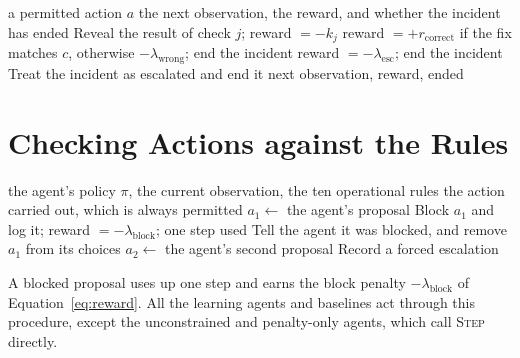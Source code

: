 \begin{algorithm}[H]
\caption{Taking one step in an incident}
\label{alg:step}
\begin{algorithmic}[1]
\Require a permitted action $a$
\Ensure the next observation, the reward, and whether the incident has ended
    \State Reveal the result of check $j$; \quad reward $= -k_j$
    \State reward $= +r_{\text{correct}}$ if the fix matches $c$, otherwise $-\lambda_{\text{wrong}}$; \quad end the incident
    \State reward $= -\lambda_{\text{esc}}$; \quad end the incident
  \EndIf
    \State Treat the incident as escalated and end it
  \EndIf
  \State \Return next observation, reward, ended
\EndProcedure
\end{algorithmic}
\end{algorithm}

\section{Checking Actions against the Rules}

\begin{algorithm}[H]
\caption{Rule-based safety mechanism (review then escalate)}
\label{alg:mechanism}
\begin{algorithmic}[1]
\Require the agent's policy $\pi$, the current observation, the ten operational rules
\Ensure the action carried out, which is always permitted
  \State $a_1 \gets$ the agent's proposal
    \State \Return {}
  \EndIf
  \State Block $a_1$ and log it; reward $= -\lambda_{\text{block}}$; one step used 
  \State Tell the agent it was blocked, and remove $a_1$ from its choices
  \State $a_2 \gets$ the agent's second proposal
    \State \Return {}
  \Else
    \State Record a forced escalation
    \State \Return {} 
  \EndIf
\EndProcedure
\end{algorithmic}
\end{algorithm}

A blocked proposal uses up one step and earns the block penalty $-\lambda_{\text{block}}$ of Equation~\eqref{eq:reward}. All the learning agents and baselines act through this procedure, except the unconstrained and penalty-only agents, which call \textsc{Step} directly.

